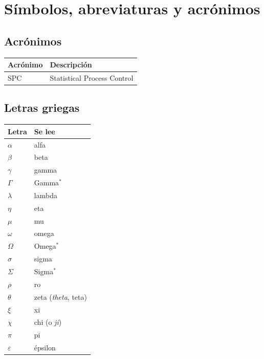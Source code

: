 \documentclass[
]{book}
\begin{document}
\hypertarget{appendix-apuxe9ndices}{%
\appendix}


\hypertarget{suxedmbolos-abreviaturas-y-acruxf3nimos}{%
\chapter{Símbolos, abreviaturas y acrónimos}\label{suxedmbolos-abreviaturas-y-acruxf3nimos}}

\hypertarget{acruxf3nimos}{%
\section{Acrónimos}\label{acruxf3nimos}}

\begin{longtable}[]{@{}ll@{}}
\toprule
Acrónimo & Descripción \\
\midrule
\endhead
SPC & Statistical Process Control \\
\bottomrule
\end{longtable}

\hypertarget{letras-griegas}{%
\section{Letras griegas}\label{letras-griegas}}

\begin{longtable}[]{@{}ll@{}}
\toprule
Letra & Se lee \\
\midrule
\endhead
\(\alpha\) & alfa \\
\(\beta\) & beta \\
\(\gamma\) & gamma \\
\(\Gamma\) & Gamma\(^*\) \\
\(\lambda\) & lambda \\
\(\eta\) & eta \\
\(\mu\) & mu \\
\(\omega\) & omega \\
\(\Omega\) & Omega\(^*\) \\
\(\sigma\) & sigma \\
\(\Sigma\) & Sigma\(^*\) \\
\(\rho\) & ro \\
\(\theta\) & zeta (\emph{theta}, teta) \\
\(\xi\) & xi \\
\(\chi\) & chi (o \emph{ji}) \\
\(\pi\) & pi \\
\(\varepsilon\) & épsilon \\
\bottomrule
\end{longtable}
\end{document}
